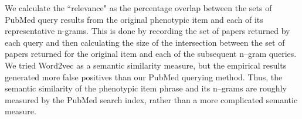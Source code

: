 \documentclass{sig-alternate-05-2015}
\newcommand{\kibitz}[2]{\ifnum\Comments=1\textcolor{#1}{#2}\fi}
\newcommand{\jette}[1]{\kibitz{red}      {[Jette: #1]}}
\begin{document}

We calculate the ``relevance" as the percentage overlap between the sets of PubMed query results from the original phenotypic item and each of its representative n-grams.
This is done by recording the set of papers returned by each query and then calculating the size of the intersection between the set of papers returned for the original item and each of the subsequent n--gram queries.
We tried Word2vec \cite{Mikolov:2013wc} as a semantic similarity measure, but the empirical results generated more false positives than our PubMed querying method.
Thus, the semantic similarity of the phenotypic item phrase and its n--grams are roughly measured by the PubMed search index, rather than a more complicated semantic measure.

\end{document}
